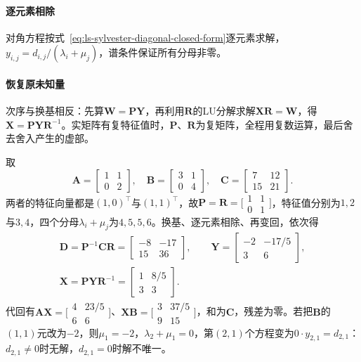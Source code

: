 \paragraph{逐元素相除}
对角方程按式~\eqref{eq:ls-sylvester-diagonal-closed-form}逐元素求解，$y_{i,j}=d_{i,j}/(\lambda_i+\mu_j)$，谱条件保证所有分母非零。

\paragraph{恢复原未知量}
次序与换基相反：先算$\bm W=\bm P\bm Y$，再利用$\bm R$的LU分解求解$\bm X\bm R=\bm W$，得$\bm X=\bm P\bm Y\bm R^{-1}$。实矩阵有复特征值时，$\bm P$、$\bm R$为复矩阵，全程用复数运算，最后舍去舍入产生的虚部。

\begin{example}[特征基下的逐元素求解]
\label{ex:ls-sylvester-eigenbasis}
取
\[
 \bm A=\begin{bmatrix}1&1\\0&2\end{bmatrix},\quad
 \bm B=\begin{bmatrix}3&1\\0&4\end{bmatrix},\quad
 \bm C=\begin{bmatrix}7&12\\15&21\end{bmatrix}.
\]
两者的特征向量都是$(1,0)^\top$与$(1,1)^\top$，故$\bm P=\bm R=\bigl[\begin{smallmatrix}1&1\\0&1\end{smallmatrix}\bigr]$，特征值分别为$1,2$与$3,4$，四个分母$\lambda_i+\mu_j$为$4,5,5,6$。换基、逐元素相除、再变回，依次得
\[
 \begin{gathered}
 \bm D=\bm P^{-1}\bm C\bm R=\begin{bmatrix}-8&-17\\15&36\end{bmatrix},\qquad
 \bm Y=\begin{bmatrix}-2&-17/5\\3&6\end{bmatrix},\\
 \bm X=\bm P\bm Y\bm R^{-1}=\begin{bmatrix}1&8/5\\3&3\end{bmatrix}.
 \end{gathered}
\]
代回有$\bm A\bm X=\bigl[\begin{smallmatrix}4&23/5\\6&6\end{smallmatrix}\bigr]$、$\bm X\bm B=\bigl[\begin{smallmatrix}3&37/5\\9&15\end{smallmatrix}\bigr]$，和为$\bm C$，残差为零。若把$\bm B$的$(1,1)$元改为$-2$，则$\mu_1=-2$，$\lambda_2+\mu_1=0$，第$(2,1)$个方程变为$0\cdot y_{2,1}=d_{2,1}$：$d_{2,1}\neq0$时无解，$d_{2,1}=0$时解不唯一。
\end{example}

